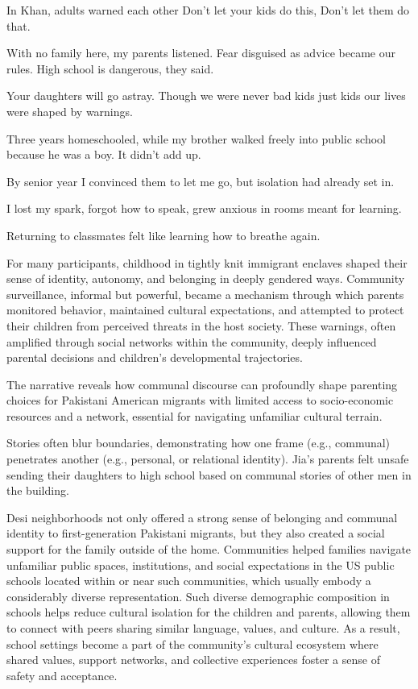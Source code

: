 \begin{FoundPoem}
In Khan, adults warned each other
Don’t let your kids do this,
Don’t let them do that.

With no family here,
my parents listened.
Fear disguised as advice
became our rules.
High school is dangerous, they said.

Your daughters will go astray.
Though we were never bad kids
just kids
our lives were shaped by warnings.

Three years homeschooled,
while my brother
walked freely into public school
because he was a boy.
It didn’t add up.

By senior year
I convinced them to let me go,
but isolation had already set in.

I lost my spark,
forgot how to speak,
grew anxious in rooms
meant for learning.

Returning to classmates
felt like learning
how to breathe again.    
\end{FoundPoem}

For many participants, childhood in tightly knit immigrant enclaves shaped their sense of identity, autonomy, and belonging in deeply gendered ways. Community surveillance, informal but powerful, became a mechanism through which parents monitored behavior, maintained cultural expectations, and attempted to protect their children from perceived threats in the host society. These warnings, often amplified through social networks within the community, deeply influenced parental decisions and children’s developmental trajectories.

The narrative reveals how communal discourse can profoundly shape parenting choices for Pakistani American migrants with limited access to socio-economic resources and a network, essential for navigating unfamiliar cultural terrain. 

Stories often blur boundaries, demonstrating how one frame (e.g., communal) penetrates another (e.g., personal, or relational identity). Jia’s parents felt unsafe sending their daughters to high school based on communal stories of other men in the building.

Desi neighborhoods not only offered a strong sense of belonging and communal identity to first-generation Pakistani migrants, but they also created a social support for the family outside of the home. Communities helped families navigate unfamiliar public spaces, institutions, and social expectations in the US public schools located within or near such communities, which usually embody a considerably diverse representation. Such diverse demographic composition in schools helps reduce cultural isolation for the children and parents, allowing them to connect with peers sharing similar language, values, and culture. As a result, school settings become a part of the community’s cultural ecosystem where shared values, support networks, and collective experiences foster a sense of safety and acceptance.

